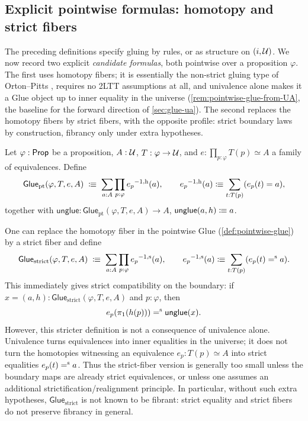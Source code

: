 \begin{longversion}
\subsection{Explicit pointwise formulas: homotopy and strict fibers}\label{sec:strict-glue-from-ua}

The preceding definitions specify gluing by rules, or as structure on
$(i,\mathcal{U})$. We now record two explicit \emph{candidate formulas}, both
pointwise over a proposition $\varphi$. The first uses homotopy fibers; it
is essentially the non-strict gluing type of Orton--Pitts
\citep[Def.~6.1]{OrtonPitts2018}, requires no 2LTT assumptions at all, and
univalence alone makes it a Glue object up to inner equality in the universe
(\cref{rem:pointwise-glue-from-UA}, the baseline for the forward direction
of \cref{sec:glue-ua}). The second replaces the homotopy fibers by strict
fibers, with the opposite profile: strict boundary laws by construction,
fibrancy only under extra hypotheses.

\begin{definition}\label{def:pointwise-glue}
	Let \(\varphi : \mathsf{Prop}\) be a proposition, \(A : \mathcal{U}\), \(T : \varphi \to \mathcal{U}\),
	and \(e : \prod_{p:\varphi} T(p) \simeq A\) a family of equivalences. Define
	\[
		\mathsf{Glue}_{\mathrm{pt}}(\varphi,T,e,A)
		\;\mathrel{\vcentcolon\mspace{-1mu}\equiv}\;
		\sum_{a:A}\prod_{p:\varphi}{e_p}^{-1, \textup{h}}(a),
		\qquad
		{e_p}^{-1, \textup{h}}(a) \mathrel{\vcentcolon\mspace{-1mu}\equiv} \sum_{t:T(p)}(e_p(t)=a),
	\]
	together with
	\(\mathsf{unglue} : \mathsf{Glue}_{\mathrm{pt}}(\varphi,T,e,A) \to A\),
	\(\mathsf{unglue}(a,h) \mathrel{\vcentcolon\mspace{-1mu}\equiv} a\).
\end{definition}


\begin{remark}
One can replace the homotopy fiber in the pointwise Glue
(\cref{def:pointwise-glue}) by a strict fiber and define
\[
  \mathsf{Glue}_{\mathrm{strict}}(\varphi,T,e,A)
  \;\mathrel{\vcentcolon\mspace{-1mu}\equiv}\;
  \sum_{a:A}\prod_{p:\varphi}{e_p}^{-1, \textup{s}}(a),
  \qquad
  {e_p}^{-1, \textup{s}}(a)
  \mathrel{\vcentcolon\mspace{-1mu}\equiv}
  \sum_{t:T(p)}(e_p(t)\mathrel{=^\textup{s}} a).
\]
This immediately gives strict compatibility on the boundary: if
\(x=(a,h):\mathsf{Glue}_{\mathrm{strict}}(\varphi,T,e,A)\) and
\(p:\varphi\), then
\[
  e_p(\pi_1(h(p))) \mathrel{=^\textup{s}} \mathsf{unglue}(x).
\]
However, this stricter definition is not a consequence of univalence alone.
Univalence turns equivalences into inner equalities in the universe; it does not turn the
homotopies witnessing an equivalence \(e_p:T(p)\simeq A\) into strict equalities
\(e_p(t)\mathrel{=^\textup{s}} a\). Thus the strict-fiber version is generally too small unless
the boundary maps are already strict equivalences, or unless one assumes an
additional strictification/realignment principle. In particular, without such extra
hypotheses, \(\mathsf{Glue}_{\mathrm{strict}}\) is not known to be fibrant:
strict equality and strict fibers do not preserve fibrancy in general.
\end{remark}


\end{longversion}
